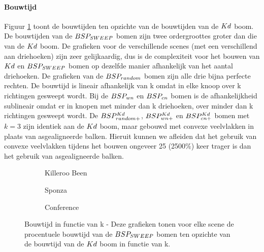 \paragraph{Bouwtijd} Figuur \ref{fig:k-bouwtijd} toont de bouwtijden ten opzichte van de bouwtijden van de $Kd$ boom. De bouwtijden van de $BSP_{SWEEP}$ bomen zijn twee ordergroottes groter dan die van de $Kd$ boom. De grafieken voor de verschillende scenes (met een verschillend aan driehoeken) zijn zeer gelijkaardig, dus is de complexiteit voor het bouwen van $Kd$ en $BSP_{SWEEP}$ bomen op dezelfde manier afhankelijk van het aantal driehoeken. De grafieken van de $BSP_{random}$ bomen zijn alle drie bijna perfecte rechten. De bouwtijd is lineair afhankelijk van k omdat in elke knoop over k richtingen gesweept wordt. Bij de $BSP_{wn}$ en $BSP_{cn}$ bomen is de afhankelijkheid sublineair omdat er in knopen met minder dan k driehoeken, over minder dan k richtingen gesweept wordt. 
De $BSP^{Kd}_{random+}$, $BSP^{Kd}_{wn+}$ en $BSP^{Kd}_{cn+}$ bomen met $k = 3$ zijn identiek aan de $Kd$ boom, maar gebouwd met convexe veelvlakken in plaats van asgealigneerde balken.
Hieruit kunnen we afleiden dat het gebruik van convexe veelvlakken tijdens het bouwen ongeveer 25 (2500\%) keer trager is dan het gebruik van asgealigneerde balken.
\begin{figure}[h]
  \centering
  \begin{subfigure}[t]{.32\linewidth}
    \centering
{}
  \caption{Killeroo Been}
  \end{subfigure}
  \begin{subfigure}[t]{.32\linewidth}
    \centering
{}
\caption{Sponza}
\end{subfigure}
\begin{subfigure}[t]{.32\linewidth}
  \centering
{}
\caption{Conference}
\end{subfigure}
\caption[Bouwtijd in functie van k]{Bouwtijd in functie van k - \small Deze grafieken tonen voor elke scene de procentuele bouwtijd van de $BSP_{SWEEP}$ bomen ten opzichte van de bouwtijd van de $Kd$ boom in functie van k.}
\label{fig:k-bouwtijd}
\end{figure}


